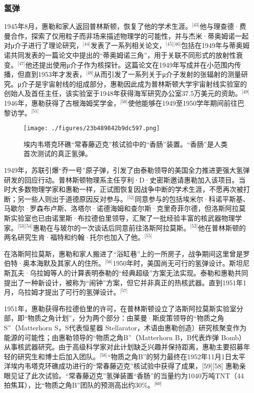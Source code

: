 \subsubsection{氢弹}
1945年8月，惠勒和家人返回普林斯顿，恢复了他的学术生涯。\(^\text{[43]}\)他与理查德·费曼合作，探索了仅用粒子而非场来描述物理学的可能性，并与杰米·蒂奥姆诺一起对μ介子进行了理论研究，\(^\text{[44]}\)发表了一系列相关论文，\(^\text{[45][46]}\)包括在1949年与蒂奥姆诺共同发表的一篇论文中提出的“蒂奥姆诺三角”，用于关联不同形式的放射性衰变。\(^\text{[47]}\)他还提出使用μ介子作为核探针。这篇论文在1949年写成并在小范围内传播，但直到1953年才发表，\(^\text{[48]}\)从而引发了一系列关于μ介子发射的张辐射的测量研究。μ介子是宇宙射线的组成部分，惠勒因此成为普林斯顿大学宇宙射线实验室的创始人及首任主任，该实验室于1948年获得海军研究办公室37.5万美元的资助。\(^\text{[49]}\)1946年，惠勒获得了古根海姆奖学金，\(^\text{[50]}\)使他能够在1949至1950学年期间前往巴黎访学。\(^\text{[51]}\)
\begin{figure}[ht]
\centering
\texttt{[image: ./figures/23b489842b9dc597.png]}
\caption{埃内韦塔克环礁“常春藤迈克”核试验中的“香肠”装置。“香肠”是人类首次测试的真正氢弹。} \label{fig_YHhl_2}
\end{figure}
1949年，苏联引爆“乔一号”原子弹，引发了由泰勒领导的美国全力推进更强大氢弹研发的回应行动。普林斯顿物理系主任亨利·D·史密斯邀请惠勒加入该项目。当时大多数物理学家和惠勒一样，正试图恢复因战争中断的学术生涯，不愿再次被打断；另一些人则出于道德原因反对参与。\(^\text{[52]}\)同意参与的包括埃米尔·科诺平斯基、马歇尔·罗森布卢斯、洛塔尔·诺德海姆和查尔斯·克里奇菲尔德，但洛斯阿拉莫斯实验室也已由诺里斯·布拉德伯里领导，汇聚了一批经验丰富的核武器物理学家。\(^\text{[53][54]}\)惠勒在与玻尔的一次谈话后同意前往洛斯阿拉莫斯。\(^\text{[52]}\)他在普林斯顿的两名研究生肯·福特和约翰·托尔也加入了他。\(^\text{[55]}\)

在洛斯阿拉莫斯，惠勒和家人搬进了“浴缸巷”上的一所房子，战争期间这里曾是罗伯特·奥本海默及其家人的住所。\(^\text{[56]}\)1950年时，美国尚无可行的氢弹设计。斯坦尼斯瓦夫·乌拉姆等人的计算表明泰勒的“经典超级”方案无法实现。泰勒和惠勒共同提出了一种新设计，被称为“闹钟”方案，但它并非真正的热核武器。直到1951年1月，乌拉姆才提出了可行的氢弹设计。\(^\text{[57]}\)

1951年，惠勒获得布拉德伯里的许可，在普林斯顿设立了洛斯阿拉莫斯实验室分部，即“物质之角计划”，分为两个部分：由莱曼·斯皮策领导的“物质之角S”（Matterhorn S，S代表恒星器 Stellarator，术语由惠勒创造）研究核聚变作为能源的可能性；由惠勒领导的“物质之角B”（Matterhorn B，B代表炸弹 Bomb）从事核武器研究。由于高级科学家对此计划缺乏兴趣并保持距离，惠勒主要招募年轻的研究生和博士后加入团队。\(^\text{[58]}\)“物质之角B”的努力最终在1952年11月1日太平洋埃内韦塔克环礁成功进行的“常春藤迈克”核试验中获得了成果，[59][58] 惠勒亲眼见证了此次试验。“常春藤迈克”氢弹装置“香肠”的当量约为1040万吨TNT（44拍焦耳），比“物质之角B”团队的预测高出约30\%。\(^\text{[60]}\)

